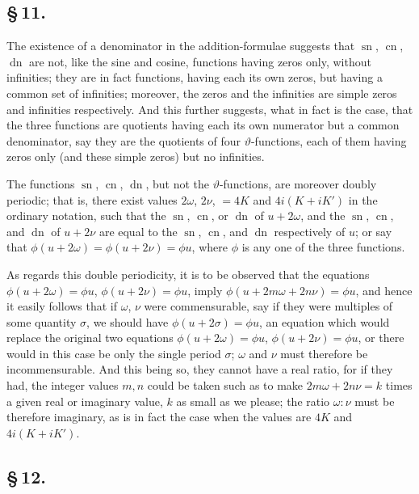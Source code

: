 \documentclass[11pt,a4paper]{article}
\DeclareMathOperator{\sn}{sn}
\DeclareMathOperator{\cn}{cn}
\DeclareMathOperator{\dn}{dn}
\begin{document}
\subsection*{\S\,11.}

The existence of a denominator in the addition-formulae suggests that $\sn$, $\cn$, $\dn$ are not, like the sine and cosine, functions having zeros only, without infinities; they are in fact functions, having each its own zeros, but having a common set of infinities; moreover, the zeros and the infinities are simple zeros and infinities respectively. And this further suggests, what in fact is the case, that the three functions are quotients having each its own numerator but a common denominator, say they are the quotients of four $\vartheta$-functions, each of them having zeros only (and these simple zeros) but no infinities.

The functions $\sn$, $\cn$, $\dn$, but not the $\vartheta$-functions, are moreover doubly periodic; that is, there exist values $2\omega$, $2\nu$, $= 4K$ and $4i(K + iK')$ in the ordinary notation, such that the $\sn$, $\cn$, or $\dn$ of $u + 2\omega$, and the $\sn$, $\cn$, and $\dn$ of $u + 2\nu$ are equal to the $\sn$, $\cn$, and $\dn$ respectively of $u$; or say that $\phi(u + 2\omega) = \phi(u + 2\nu) = \phi u$, where $\phi$ is any one of the three functions.

As regards this double periodicity, it is to be observed that the equations $\phi(u + 2\omega) = \phi u$, $\phi(u + 2\nu) = \phi u$, imply $\phi(u + 2m\omega + 2n\nu) = \phi u$, and hence it easily follows that if $\omega$, $\nu$ were commensurable, say if they were multiples of some quantity $\sigma$, we should have $\phi(u + 2\sigma) = \phi u$, an equation which would replace the original two equations $\phi(u + 2\omega) = \phi u$, $\phi(u + 2\nu) = \phi u$, or there would in this case be only the single period $\sigma$; $\omega$ and $\nu$ must therefore be incommensurable. And this being so, they cannot have a real ratio, for if they had, the integer values $m, n$ could be taken such as to make $2m\omega + 2n\nu = k$ times a given real or imaginary value, $k$ as small as we please; the ratio $\omega : \nu$ must be therefore imaginary, as is in fact the case when the values are $4K$ and $4i(K + iK')$.

\subsection*{\S\,12.}
\end{document}
